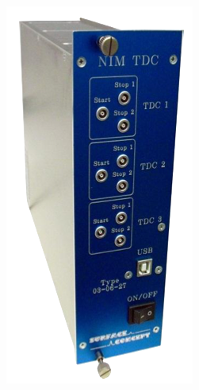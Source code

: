 \begin{figure}[!h]
	\vspace{1cm}
    \begin{subfigure}[t]{0.2\textwidth}
        \includegraphics[height=0.25\textheight, width=\textwidth, keepaspectratio]{figures/NIM_TDC.png}

\end{subfigure}
\end{figure}
